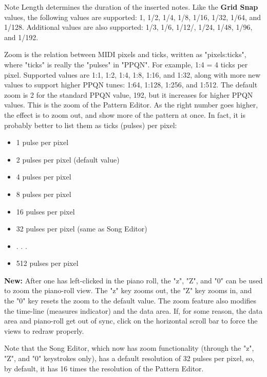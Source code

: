    Note Length determines the duration of the inserted notes.
   Like the \textbf{Grid Snap} values,
   the following values are supported:
   1, 1/2, 1/4, 1/8, 1/16, 1/32, 1/64, and 1/128.
   Additional values are also supported:
   1/3, 1/6, 1/12/, 1/24, 1/48, 1/96, and 1/192.

   Zoom is the relation between MIDI pixels and ticks, written as
   "pixels:ticks", where "ticks" is really the "pulses" in "PPQN".
   For example, 1:4 = 4 ticks per pixel.
   Supported values are 1:1, 1:2, 1:4, 1:8, 1:16, and 1:32, along with
   more new values to support higher PPQN tunes: 1:64, 1:128, 1:256, and
   1:512.
   The default zoom is 2 for the standard PPQN value, 192, but it
   increases for higher PPQN values.
   This is the zoom of the Pattern Editor.  As the right number goes higher,
   the effect is to zoom out, and show more of the pattern at once.
   In fact, it is probably better to list them as ticks (pulses) per pixel:

   \begin{itemize}
      \item 1 pulse per pixel
      \item 2 pulses per pixel (default value)
      \item 4 pulses per pixel
      \item 8 pulses per pixel
      \item 16 pulses per pixel
      \item 32 pulses per pixel (same as Song Editor)
      \item . . .
      \item 512 pulses per pixel
   \end{itemize}

   \textbf{New:}
   After one has left-clicked in the piano roll, the "z", "Z", and "0"
   can be used to zoom the piano-roll view.  The "z" key zooms out, the "Z" key
   zooms in, and the "0" key resets the zoom to the default value.
   The zoom feature also modifies the time-line (measures indicator) and
   the data area.
   If, for some reason, the data area and piano-roll get out of sync, click on
   the horizontal scroll bar to force the views to redraw properly.

   Note that the Song Editor, which now has zoom functionality (through
   the "z", "Z", and "0" keystrokes only),
   has a default resolution of 32 pulses per pixel, so, by default, it has
   16 times the resolution of the Pattern Editor.

